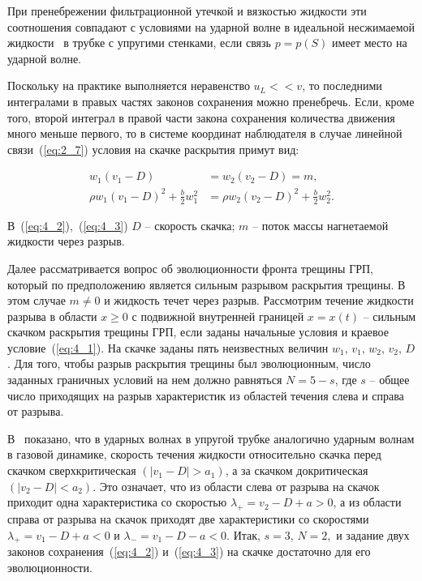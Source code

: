 При пренебрежении фильтрационной утечкой и вязкостью жидкости эти соотношения совпадают с условиями на ударной волне в идеальной несжимаемой жидкости~\cite{pedli1} в трубке с упругими стенками, если связь $p = p(S)$ имеет место на ударной волне. 



Поскольку на практике выполняется неравенство $u_L << v$, то последними интегралами в правых частях законов сохранения можно пренебречь. Если, кроме того, второй интеграл в правой части закона сохранения количества движения много меньше первого, то в системе координат наблюдателя в случае линейной связи~(\ref{eq:2_7}) условия на скачке раскрытия примут вид:

\begin{align}

w_1 \left(v_1 - D\right) &=w_2 \left(v_2 - D\right) = m , \label{eq:4_2} \\

\rho w_1 \left(v_1 - D\right)^2 + \frac{b}{2} w_1^2 &=\rho w_2 \left(v_2 - D\right)^2 + \frac{b}{2} w_2^2 . \label{eq:4_3} 

\end{align}



В~(\ref{eq:4_2}),~(\ref{eq:4_3}) $D$ – скорость скачка; $m$ – поток массы нагнетаемой жидкости через разрыв. 



Далее рассматривается вопрос об эволюционности фронта трещины ГРП, который по предположению является сильным разрывом раскрытия трещины. В этом случае $m \neq 0$ и жидкость течет через разрыв. Рассмотрим течение жидкости разрыва в области $x \geq 0$  с подвижной внутренней границей $x = x(t)$ – сильным скачком раскрытия трещины ГРП, если заданы начальные условия и краевое условие~(\ref{eq:4_1}). На скачке заданы пять неизвестных величин $w_1,\, v_1,\, w_2,\, v_2,\, D$. Для того, чтобы разрыв раскрытия трещины был эволюционным, число заданных граничных условий на нем должно равняться $N= 5-s$, где $s$ – общее число приходящих на разрыв характеристик из областей течения слева и справа от разрыва. 



В~\cite{pedli1} показано, что в ударных волнах в упругой трубке аналогично ударным волнам в газовой динамике, скорость течения жидкости относительно скачка перед скачком сверхкритическая $\left(\left|v_1-D\right|> a_1\right)$, а за скачком докритическая $\left(\left|v_2-D\right|< a_2\right)$. Это означает, что из области слева от разрыва на скачок приходит одна характеристика со скоростью  $\lambda_+ = v_2 - D + a>0$, а из области справа от разрыва на скачок приходят две характеристики со скоростями $\lambda_+ = v_1 - D + a<0$ и $\lambda_- = v_1 - D - a<0$. Итак, $s=3,\, N=2,$ и задание двух законов сохранения~(\ref{eq:4_2}) и~(\ref{eq:4_3}) на скачке достаточно для его эволюционности. 



